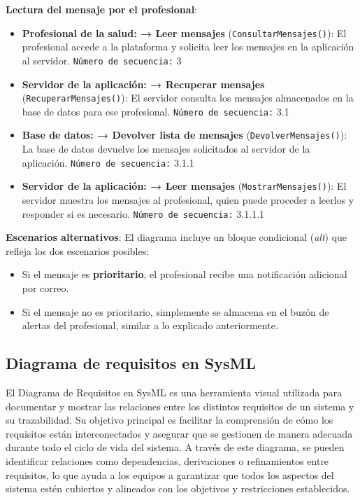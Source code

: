 \documentclass{article}
\begin{document}
\textbf{Lectura del mensaje por el profesional}:
\begin{itemize}
	\item \textbf{Profesional de la salud: → Leer mensajes} (\texttt{ConsultarMensajes()}): El profesional accede a la plataforma y solicita leer los mensajes en la aplicación al servidor. \texttt{Número de secuencia:}  {3}
	\item \textbf{Servidor de la aplicación: → Recuperar mensajes} (\texttt{RecuperarMensajes()}): El servidor consulta los mensajes almacenados en la base de datos para ese profesional. \texttt{Número de secuencia:}  {3.1}
	\item \textbf{Base de datos: → Devolver lista de mensajes} (\texttt{DevolverMensajes()}): La base de datos devuelve los mensajes solicitados al servidor de la aplicación. \texttt{Número de secuencia:}  {3.1.1}
	\item \textbf{Servidor de la aplicación: → Leer mensajes} (\texttt{MostrarMensajes()}): El servidor muestra los mensajes al profesional, quien puede proceder a leerlos y responder si es necesario. \texttt{Número de secuencia:}  {3.1.1.1}
\end{itemize}

\textbf{Escenarios alternativos}:
El diagrama incluye un bloque condicional (\textit{alt}) que refleja los dos escenarios posibles:
\begin{itemize}
	\item Si el mensaje es \textbf{prioritario}, el profesional recibe una notificación adicional por correo.
	\item Si el mensaje no es prioritario, simplemente se almacena en el buzón de alertas del profesional, similar a lo explicado anteriormente.
\end{itemize}


\subsection{Diagrama de requisitos en  SysML}

El Diagrama de Requisitos en SysML es una herramienta visual utilizada para documentar y mostrar las relaciones entre los distintos requisitos de un sistema y su trazabilidad. Su objetivo principal es facilitar la comprensión de cómo los requisitos están interconectados y asegurar que se gestionen de manera adecuada durante todo el ciclo de vida del sistema. A través de este diagrama, se pueden identificar relaciones como dependencias, derivaciones o refinamientos entre requisitos, lo que ayuda a los equipos a garantizar que todos los aspectos del sistema estén cubiertos y alineados con los objetivos y restricciones establecidos.
\\
\end{document}
